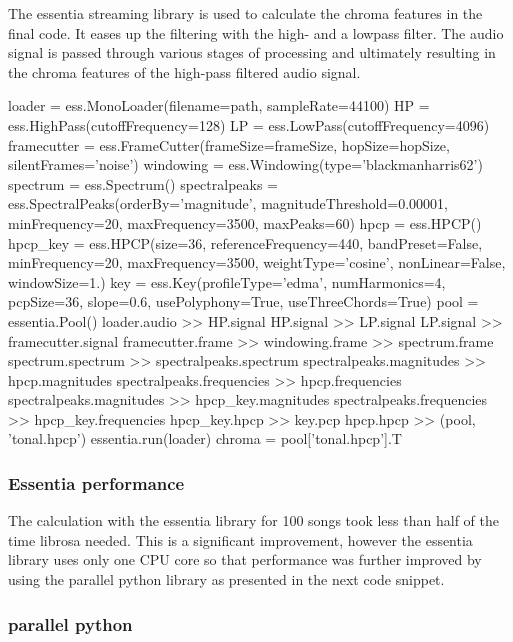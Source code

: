 The essentia streaming library is used to calculate the chroma features in the final code. It eases up the filtering with the high- and a lowpass filter. The audio signal is passed through various stages of processing and ultimately resulting in the chroma features of the high-pass filtered audio signal. 
\newpage
\begin{pythonCode}[frame=single,label={lst:essst},caption={essentia streaming},captionpos=b]
loader = ess.MonoLoader(filename=path, sampleRate=44100)
HP = ess.HighPass(cutoffFrequency=128)
LP = ess.LowPass(cutoffFrequency=4096)
framecutter = ess.FrameCutter(frameSize=frameSize, hopSize=hopSize, 
	silentFrames='noise')
windowing = ess.Windowing(type='blackmanharris62')
spectrum = ess.Spectrum()
spectralpeaks = ess.SpectralPeaks(orderBy='magnitude', magnitudeThreshold=0.00001, 
	minFrequency=20, maxFrequency=3500, maxPeaks=60)
hpcp = ess.HPCP()
hpcp_key = ess.HPCP(size=36, referenceFrequency=440, bandPreset=False, minFrequency=20,
	maxFrequency=3500, weightType='cosine', nonLinear=False, windowSize=1.)
key = ess.Key(profileType='edma', numHarmonics=4, pcpSize=36, slope=0.6, 
	usePolyphony=True, useThreeChords=True)
pool = essentia.Pool()
loader.audio >> HP.signal
HP.signal >> LP.signal
LP.signal >> framecutter.signal    
framecutter.frame >> windowing.frame >> spectrum.frame
spectrum.spectrum >> spectralpeaks.spectrum
spectralpeaks.magnitudes >> hpcp.magnitudes
spectralpeaks.frequencies >> hpcp.frequencies
spectralpeaks.magnitudes >> hpcp_key.magnitudes
spectralpeaks.frequencies >> hpcp_key.frequencies
hpcp_key.hpcp >> key.pcp
hpcp.hpcp >> (pool, 'tonal.hpcp')
essentia.run(loader)
chroma = pool['tonal.hpcp'].T
\end{pythonCode}	

\subsubsection{Essentia performance}

The calculation with the essentia library for 100 songs took less than half of the time librosa needed. This is a significant improvement, however the essentia library uses only one CPU core so that performance was further improved by using the parallel python library as presented in the next code snippet.

\subsubsection{parallel python}


